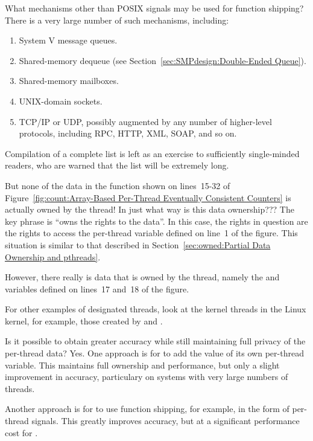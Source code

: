 \QuickQ{}
	What mechanisms other than POSIX signals may be used for function
	shipping?
\QuickA{}
	There is a very large number of such mechanisms, including:
	\begin{enumerate}
	\item	System V message queues.
	\item	Shared-memory dequeue (see
		Section~\ref{sec:SMPdesign:Double-Ended Queue}).
	\item	Shared-memory mailboxes.
	\item	UNIX-domain sockets.
	\item	TCP/IP or UDP, possibly augmented by any number of
		higher-level protocols, including RPC, HTTP,
		XML, SOAP, and so on.
	\end{enumerate}
	Compilation of a complete list is left as an exercise to
	sufficiently single-minded readers, who are warned that the
	list will be extremely long.

\QuickQ{}
	But none of the data in the  function shown on
	lines~15-32 of
	Figure~\ref{fig:count:Array-Based Per-Thread Eventually Consistent Counters}
	is actually owned by the  thread!
	In just what way is this data ownership???
\QuickA{}
	The key phrase is ``owns the rights to the data''.
	In this case, the rights in question are the rights to access
	the per-thread  variable defined on line~1
	of the figure.
	This situation is similar to that described in
	Section~\ref{sec:owned:Partial Data Ownership and pthreads}.

	However, there really is data that is owned by the 
	thread, namely the  and  variables defined on
	lines~17 and~18 of the figure.

	For other examples of designated threads, look at the kernel
	threads in the Linux kernel, for example, those created by
	 and .

\QuickQ{}
	Is it possible to obtain greater accuracy while still
	maintaining full privacy of the per-thread data?
\QuickA{}
	Yes.
	One approach is for  to add the value
	of its own per-thread variable.
	This maintains full ownership and performance, but only
	a slight improvement in accuracy, particulary on systems
	with very large numbers of threads.

	Another approach is for  to use function
	shipping, for example, in the form of per-thread signals.
	This greatly improves accuracy, but at a significant performance
	cost for .

